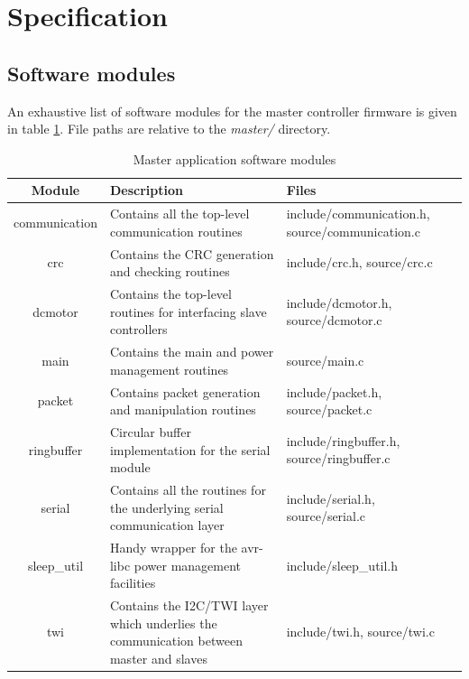 \documentclass[binding=0.6cm,Lau]{sapthesis}
\begin{document}
\section{Specification}

\subsection{Software modules}
An exhaustive list of software modules for the master controller firmware is
given in table \ref{tab:master-spec-modules}. File paths are relative to the
\emph{master/} directory.

\begin{table}[bh]
  \begin{tabularx}{\textwidth}{c X X}
    \toprule
    Module & Description & Files \\
    \midrule
    communication &
      Contains all the top-level communication routines &
      include/communication.h, source/communication.c \\
    crc &
      Contains the CRC generation and checking routines &
      include/crc.h, source/crc.c \\
    dcmotor &
      Contains the top-level routines for interfacing slave controllers &
      include/dcmotor.h, source/dcmotor.c \\
    main &
      Contains the main and power management routines &
      source/main.c \\
    packet &
      Contains packet generation and manipulation routines &
      include/packet.h, source/packet.c \\
    ringbuffer &
      Circular buffer implementation for the serial module &
      include/ringbuffer.h, source/ringbuffer.c \\
    serial &
      Contains all the routines for the underlying serial communication layer &
      include/serial.h, source/serial.c \\
    sleep\_util &
      Handy wrapper for the avr-libc power management facilities &
      include/sleep\_util.h \\
    twi &
      Contains the I2C/TWI layer which underlies the communication between master and slaves &
      include/twi.h, source/twi.c \\
    \bottomrule
  \end{tabularx}
  \caption{Master application software modules}
  \label{tab:master-spec-modules}
\end{table}
\end{document}
